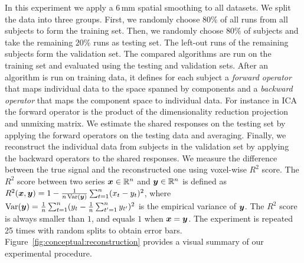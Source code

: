 In this experiment we apply a 6\,mm spatial smoothing to all datasets. 
We split the data into three groups. First, we randomly choose $80\%$ of all runs from all subjects to form the training set.
%
Then, we randomly choose $80\%$ of subjects and take the remaining $20\%$  runs as testing set.
%
The left-out runs  of the remaining subjects form the validation set.
%
The compared algorithms are run on the training set and evaluated using the testing and validation sets.
%
After an algorithm is run on training data, it defines for each subject a \emph{forward operator} that maps individual data to the space spanned by components and a \emph{backward operator} that maps the component space to individual data. For instance in ICA the forward operator is the product of the dimensionality reduction projection and unmixing matrix.
%
We estimate the shared responses on the testing set by applying the forward operators on the testing data and averaging. Finally, we reconstruct the individual data from subjects in the validation set by applying the backward operators to the shared responses. We measure the difference between the true signal and the reconstructed one using voxel-wise $R^2$ score. The $R^2$ score between two series $\boldsymbol{x} \in \mathbb{R}^n$ and $\boldsymbol{y} \in \mathbb{R}^n$ is defined as
$R^2(\boldsymbol{x}, \boldsymbol{y}) = 1 - \frac1{n\operatorname*{Var}(\boldsymbol{y})}\sum_{t=1}^n (x_t - y_t)^2$, where $\operatorname*{Var}(\boldsymbol{y}) = \frac1n\sum_{t=1}^n (y_t - \frac1n \sum_{t'=1}^n y_{t'})^2$ is the empirical variance of $\boldsymbol{y}$.
%
The $R^2$ score is always smaller than $1$, and equals $1$ when $\boldsymbol{x}= \boldsymbol{y}$.
The experiment is repeated 25 times with random splits to obtain error bars.
Figure~\ref{fig:conceptual:reconstruction} provides a visual summary of our
experimental procedure.

